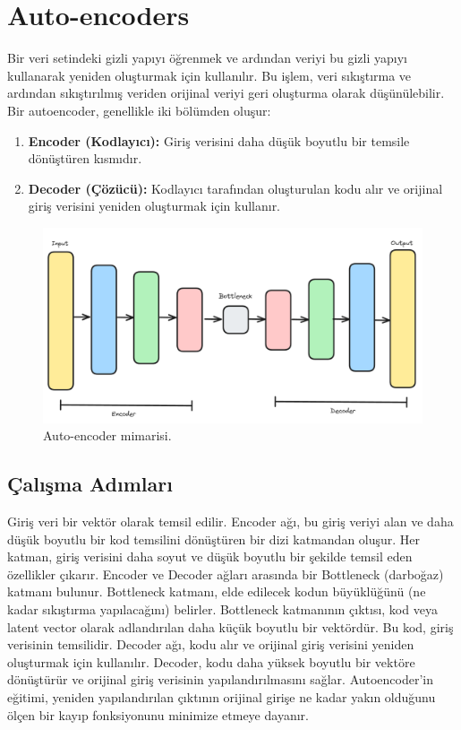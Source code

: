 \section{Auto-encoders}
Bir veri setindeki gizli yapıyı öğrenmek ve ardından veriyi bu gizli yapıyı kullanarak yeniden oluşturmak için kullanılır. Bu işlem, veri sıkıştırma ve ardından sıkıştırılmış veriden orijinal veriyi geri oluşturma olarak düşünülebilir. Bir autoencoder, genellikle iki bölümden oluşur:
\begin{enumerate}
    \item \textbf{Encoder (Kodlayıcı):} Giriş verisini daha düşük boyutlu bir temsile dönüştüren kısmıdır.
    \item \textbf{Decoder (Çözücü):} Kodlayıcı tarafından oluşturulan kodu alır ve orijinal giriş verisini yeniden oluşturmak için kullanır. 
\end{enumerate}

\begin{figure}[h]
    \centering
    \includegraphics[width=1\textwidth]{images/autoencoder_architecture.png}
    \caption{Auto-encoder mimarisi.}
    \label{fig:enter-label}
\end{figure}

\subsection{Çalışma Adımları}
Giriş veri bir vektör olarak temsil edilir. Encoder ağı, bu giriş veriyi alan ve daha düşük boyutlu bir kod temsilini dönüştüren bir dizi katmandan oluşur. Her katman, giriş verisini daha soyut ve düşük boyutlu bir şekilde temsil eden özellikler çıkarır. Encoder ve Decoder ağları arasında bir Bottleneck (darboğaz) katmanı bulunur. Bottleneck katmanı, elde edilecek kodun büyüklüğünü (ne kadar sıkıştırma yapılacağını) belirler. Bottleneck katmanının çıktısı, kod veya latent vector olarak adlandırılan daha küçük boyutlu bir vektördür. Bu kod, giriş verisinin temsilidir. Decoder ağı, kodu alır ve orijinal giriş verisini yeniden oluşturmak için kullanılır. Decoder, kodu daha yüksek boyutlu bir vektöre dönüştürür ve orijinal giriş verisinin yapılandırılmasını sağlar. Autoencoder'in eğitimi, yeniden yapılandırılan çıktının orijinal girişe ne kadar yakın olduğunu ölçen bir kayıp fonksiyonunu minimize etmeye dayanır. 

